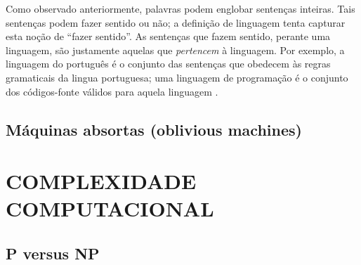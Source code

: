 Como observado anteriormente,
palavras podem englobar sentenças inteiras.
Tais sentenças podem fazer sentido ou não;
a definição de linguagem
tenta capturar esta noção de ``fazer sentido''.
As sentenças que fazem sentido,
perante uma linguagem,
são justamente aquelas que \emph{pertencem} à linguagem.
Por exemplo, a linguagem do português
é o conjunto das sentenças
que obedecem às regras gramaticais
da lingua portuguesa;
uma linguagem de programação
é o conjunto dos códigos-fonte válidos para aquela linguagem
\cite[p. 31]{HopcroftMotwaniUllman2001}.

\subsection{Máquinas absortas (oblivious machines)}

\section{COMPLEXIDADE COMPUTACIONAL}

\subsection{P versus NP}
